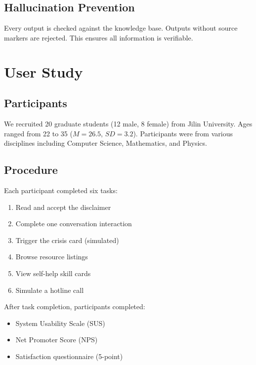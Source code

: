 \documentclass[preprint,12pt]{elsarticle}
\begin{document}
\subsection{Hallucination Prevention}

Every output is checked against the knowledge base. Outputs without source
markers are rejected. This ensures all information is verifiable.

\section{User Study}

\subsection{Participants}

We recruited 20 graduate students (12 male, 8 female) from Jilin University.
Ages ranged from 22 to 35 ($M=26.5$, $SD=3.2$). Participants were from various
disciplines including Computer Science, Mathematics, and Physics.

\subsection{Procedure}

Each participant completed six tasks:
\begin{enumerate}
    \item Read and accept the disclaimer
    \item Complete one conversation interaction
    \item Trigger the crisis card (simulated)
    \item Browse resource listings
    \item View self-help skill cards
    \item Simulate a hotline call
\end{enumerate}

After task completion, participants completed:
\begin{itemize}
    \item System Usability Scale (SUS)
    \item Net Promoter Score (NPS)
    \item Satisfaction questionnaire (5-point)
\end{itemize}
\end{document}
